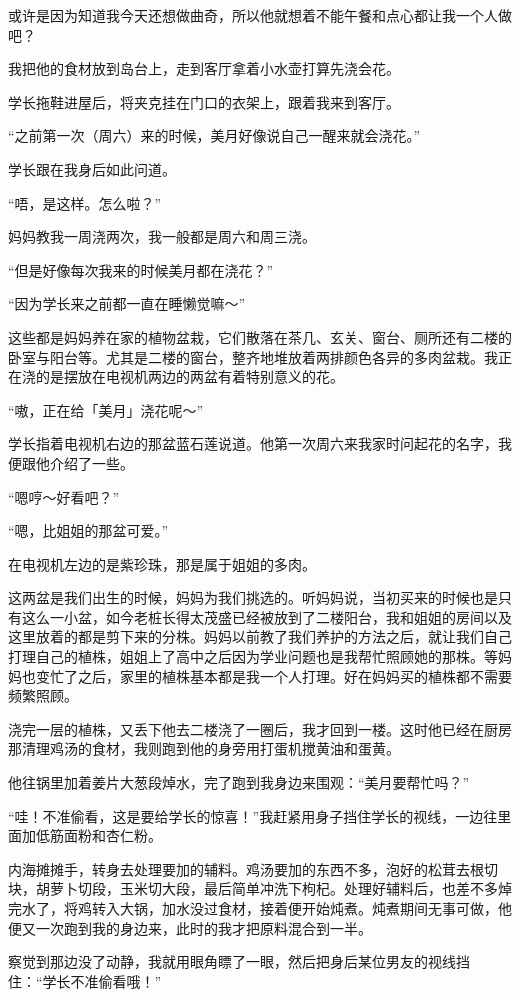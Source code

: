 或许是因为知道我今天还想做曲奇，所以他就想着不能午餐和点心都让我一个人做吧？

我把他的食材放到岛台上，走到客厅拿着小水壶打算先浇会花。

学长拖鞋进屋后，将夹克挂在门口的衣架上，跟着我来到客厅。

“之前第一次（周六）来的时候，美月好像说自己一醒来就会浇花。”

学长跟在我身后如此问道。

“唔，是这样。怎么啦？”

妈妈教我一周浇两次，我一般都是周六和周三浇。

“但是好像每次我来的时候美月都在浇花？”

“因为学长来之前都一直在睡懒觉嘛～”

这些都是妈妈养在家的植物盆栽，它们散落在茶几、玄关、窗台、厕所还有二楼的卧室与阳台等。尤其是二楼的窗台，整齐地堆放着两排颜色各异的多肉盆栽。我正在浇的是摆放在电视机两边的两盆有着特别意义的花。

“嗷，正在给「美月」浇花呢～”

学长指着电视机右边的那盆蓝石莲说道。他第一次周六来我家时问起花的名字，我便跟他介绍了一些。

“嗯哼～好看吧？”

“嗯，比姐姐的那盆可爱。”

在电视机左边的是紫珍珠，那是属于姐姐的多肉。

这两盆是我们出生的时候，妈妈为我们挑选的。听妈妈说，当初买来的时候也是只有这么一小盆，如今老桩长得太茂盛已经被放到了二楼阳台，我和姐姐的房间以及这里放着的都是剪下来的分株。妈妈以前教了我们养护的方法之后，就让我们自己打理自己的植株，姐姐上了高中之后因为学业问题也是我帮忙照顾她的那株。等妈妈也变忙了之后，家里的植株基本都是我一个人打理。好在妈妈买的植株都不需要频繁照顾。

浇完一层的植株，又丢下他去二楼浇了一圈后，我才回到一楼。这时他已经在厨房那清理鸡汤的食材，我则跑到他的身旁用打蛋机搅黄油和蛋黄。

他往锅里加着姜片大葱段焯水，完了跑到我身边来围观：“美月要帮忙吗？”

“哇！不准偷看，这是要给学长的惊喜！”我赶紧用身子挡住学长的视线，一边往里面加低筋面粉和杏仁粉。

内海摊摊手，转身去处理要加的辅料。鸡汤要加的东西不多，泡好的松茸去根切块，胡萝卜切段，玉米切大段，最后简单冲洗下枸杞。处理好辅料后，也差不多焯完水了，将鸡转入大锅，加水没过食材，接着便开始炖煮。炖煮期间无事可做，他便又一次跑到我的身边来，此时的我才把原料混合到一半。

察觉到那边没了动静，我就用眼角瞟了一眼，然后把身后某位男友的视线挡住：“学长不准偷看哦！”

